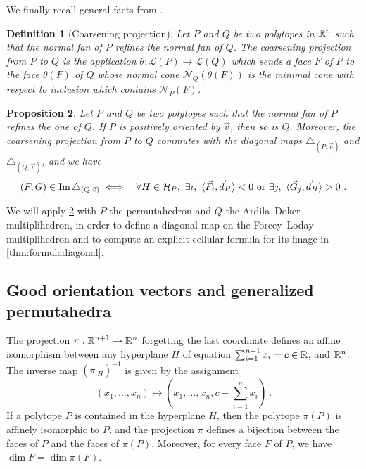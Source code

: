 \documentclass[twoside, 12pt]{amsart}
\newtheorem{definition}{Definition}[section]
\newtheorem{proposition}[definition]{Proposition}
\theoremstyle{remark}
\begin{document}
We finally recall general facts from \cite[Section 1.6]{LA21}. 

\begin{definition}[Coarsening projection] 
  \label{def:coarseningprojection} 
  Let $P$ and $Q$ be two polytopes in $\mathbb{R}^n$ such that the normal fan of $P$ refines the normal fan of $Q$. 
  The \emph{coarsening projection} from $P$ to $Q$ is the application $\theta : \mathcal{L}(P)\to\mathcal{L}(Q)$ which sends a face $F$ of $P$ to the face $\theta(F)$ of $Q$ whose normal cone $\mathcal{N}_Q(\theta(F))$ is the minimal cone with respect to inclusion which contains $\mathcal{N}_P(F)$.
\end{definition}

\begin{proposition} 
\label{prop:refinementofnormalfans}
Let $P$ and $Q$ be two polytopes such that the normal fan of $P$ refines the one of $Q$. 
If $P$ is positively oriented by $\vec v$, then so is $Q$. 
Moreover, the coarsening projection from $P$ to $Q$ commutes with the diagonal maps $\triangle_{(P,\vec v)}$ and $\triangle_{(Q,\vec v)}$, and we have 
\begin{eqnarray*}
  (F,G) \in \operatorname{Im} \triangle_{(Q,\vec v)} 
  &\iff& \forall H \in \mathcal{H}_P , \ \exists i , \ \langle \vec F_i, \vec d_H \rangle < 0  \text{ or } \exists j , \ \langle \vec G_j, \vec d_H \rangle > 0 \ .
\end{eqnarray*} 
\end{proposition}

\noindent We will apply \cref{prop:refinementofnormalfans} with $P$ the permutahedron and $Q$ the Ardila--Doker multiplihedron, in order to define a diagonal map on the Forcey--Loday multiplihedron and to compute an explicit cellular formula for its image in \cref{thm:formuladiagonal}.


\subsection{Good orientation vectors and generalized permutahedra}

The projection $\pi : \mathbb{R}^{n+1} \to \mathbb{R}^n$ forgetting the last coordinate defines an affine isomorphism between any hyperplane $H$ of equation $\sum_{i=1}^{n+1} x_i = c \in \mathbb{R}$, and $\mathbb{R}^n$. 
The inverse map $(\pi_{| H})^{-1}$ is given by the assignment \[ (x_1, \ldots, x_n) \mapsto \left(x_1, \ldots, x_n, c- \sum_{i=1}^{n}x_i\right) \ . \]
If a polytope $P$ is contained in the hyperplane $H$, then the polytope $\pi(P)$ is affinely isomorphic to $P$, and the projection $\pi$ defines a bijection between the faces of $P$ and the faces of $\pi(P)$. Moreover, for every face $F$ of $P$, we have $\dim F = \dim \pi(F)$.
\end{document}
